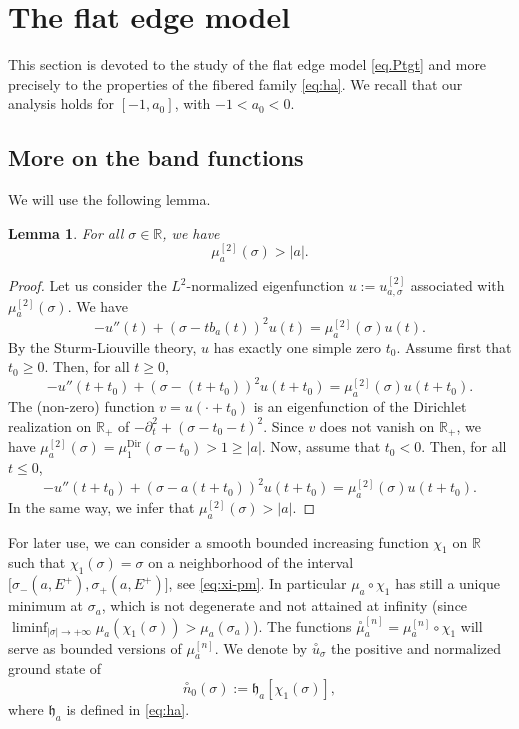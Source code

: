 \documentclass[10pt]{amsart}
\newcommand{\Dir}{\mathrm{Dir}}
\theoremstyle{plain}
\newtheorem{lemma}[theorem]{Lemma}
\theoremstyle{definition}
\newcommand{\R}{\mathbb{R}}
\begin{document}
\section{The flat edge model}\label{sec:FlatEdge}
This section is devoted to the study of the flat edge model \eqref{eq.Ptgt} and more precisely to the properties of the fibered family \eqref{eq:ha}. We recall that our analysis holds for $[-1,a_0]$, with $-1<a_0<0$.

\subsection{More on the band functions}\label{sec.chi1}
We will use the following lemma.
\begin{lemma}\label{lem.mu2}
For all $\sigma\in\R$, we have
\[
\mu_a^{[2]}(\sigma)> |a|.
\] 
\end{lemma}
\begin{proof}
Let us consider the $L^2$-normalized eigenfunction $u:=u^{[2]}_{a,\sigma}$ associated with $\mu_a^{[2]}(\sigma)$. We have
\begin{equation*}
-u''(t)+(\sigma-tb_a(t))^2u(t)=\mu_a^{[2]}(\sigma) u(t).
\end{equation*}
By the Sturm-Liouville theory, $u$ has exactly one simple zero $t_0$. Assume first that $t_0\geq 0$. Then, for all $t\geq 0$,
\[
-u''(t+t_0)+(\sigma-(t+t_0))^2u(t+t_0)=\mu_a^{[2]}(\sigma) u(t+t_0).
\]
The (non-zero) function $v=u(\cdot+t_0)$ is an eigenfunction of the Dirichlet realization on $\R_+$ of $-\partial_t^2+(\sigma-t_0-t)^2$. Since $v$ does not vanish on $\R_+$, we have $\mu_a^{[2]}(\sigma)=\mu^{\Dir}_1(\sigma-t_0)>1\geq |a|$.
Now, assume that $t_0<0$. Then, for all $t\leq 0$,
\[
-u''(t+t_0)+(\sigma-a(t+t_0))^2u(t+t_0)=\mu_a^{[2]}(\sigma) u(t+t_0).
\]
In the same way, we infer that $\mu_a^{[2]}(\sigma)>|a|$.
\end{proof}

For later use, we can consider a smooth bounded increasing function $\chi_1$ on $\R$ such that $\chi_1(\sigma)=\sigma$ on a neighborhood of the interval $[\sigma_-(a,E^+),\sigma_+(a,E^+)\bigr]$, see \eqref{eq:xi-pm}. In particular $\mu_a\circ\chi_1$ has still a unique minimum at $\sigma_a$, which is not degenerate and not attained at infinity (since $\liminf_{|\sigma| \rightarrow +\infty} \mu_a (\chi_1(\sigma))> \mu_a(\sigma_a)$).
The functions $\overset{\circ}{\mu}^{[n]}_a=\mu^{[n]}_a\circ\chi_1$ will serve as bounded versions of $\mu^{[n]}_a$. We denote by $\overset{\circ}{u}_\sigma$ the positive and normalized ground state of
\begin{equation}\label{eq:circ-n}
\overset{\circ}{n}_0(\sigma):=\mathfrak h_a[\chi_1(\sigma)],
\end{equation}
where $\mathfrak h_a$ is defined in \eqref{eq:ha}.
\end{document}
